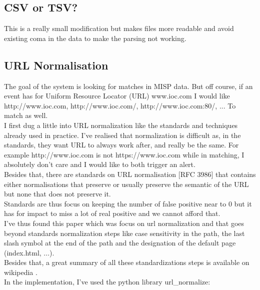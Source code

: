 \documentclass{eplmastersthesis}
\begin{document}
\subsection{CSV or TSV?}
This is a really small modification but makes files more readable and avoid existing coma in the data to make the parsing not working.

\subsection{URL Normalisation}
The goal of the system is looking for matches in MISP data. But off course, if an event has for Uniform Resource Locator (URL) www.ioc.com I would like http://www.ioc.com, http://www.ioc.com/, http://www.ioc.com:80/, ... To match as well.\\
I first dug a little into URL normalization like the standards and techniques already used in practice. I've realised that normalization is difficult as, in the standards, they want URL to always work after, and really be the same. For example http://www.ioc.com is not https://www.ioc.com while in matching, I absolutely don't care and I would like to both trigger an alert.\\
Besides that, there are standards on URL normalisation [RFC 3986] that contains either normalisations that preserve or usually preserve the semantic of the URL but none that does not preserve it.\\
Standards are thus focus on keeping the number of false positive near to 0 but it has for impact to miss a lot of real positive and we cannot afford that.\\
I've thus found this paper \cite{lee2005url} which was focus on url normalization and that goes beyond standards normalization steps like case sensitivity in the path, the last slash symbol at the end of the path and the designation of the default page (index.html, ...).\\
Besides that, a great summary of all these standardizations steps is available on wikipedia \cite{wikiNormalizationURL}.\\
In the implementation, I've used the python library url\_normalize:
\end{document}
